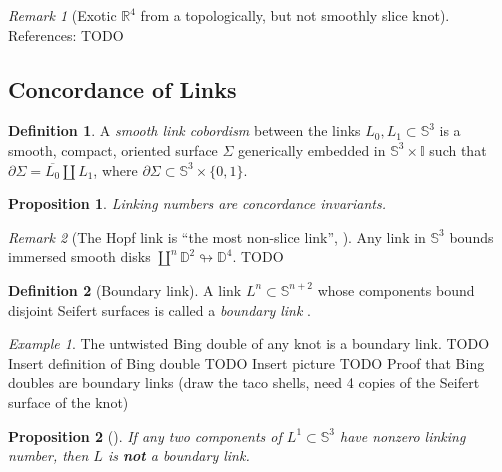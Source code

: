 \documentclass[nobib]{tufte-book} %
\newtheorem{proposition}{Proposition}
\theoremstyle{definition}
\newtheorem{definition}{Definition}
\theoremstyle{remark}
\newtheorem{remark}{Remark}
\newtheorem{example}{Example}
\newcommand{\sphere}[1]{\mathbb{S}^{#1}}
\newcommand{\disk}[1]{\mathbb{D}^{#1}}
\newcommand{\interval}{\mathbb{I}}
\newcommand{\R}{\mathbb{R}}
\begin{document}
\begin{remark}[Exotic $\R^{4}$ from a topologically, but
	not smoothly slice knot]
	References:
	\citep{57926}
	TODO
\end{remark}

\subsection{Concordance of Links}

\begin{definition}
	A \textit{smooth link cobordism}  between the links
	$L_0, L_1 \subset \sphere{3}$
	is a smooth, compact, oriented surface
	$\Sigma$ generically embedded in $\sphere{3} \times \interval$ such that
	$\partial \Sigma = \overline{L_{0}} \coprod L_{1}$,
	where $\partial \Sigma \subset \sphere{3} \times \{0, 1\}$.
\end{definition}

\begin{proposition}
	Linking numbers are concordance invariants.
\end{proposition}

\begin{remark}[The Hopf link is ``the most non-slice link'', \citep{krushkal2015slicing}]
	Any link in $\sphere{3}$ bounds immersed smooth disks
	$\coprod^{n} \disk{2} \looparrowright \disk{4}$.
	TODO
\end{remark}


\begin{definition}[Boundary link]
	A link $L^{n} \subset \sphere{n+2}$ whose components bound disjoint Seifert surfaces
	is called a \textit{boundary link} .
\end{definition}

\begin{example}
	The untwisted Bing double of any knot is a boundary link.
	TODO Insert definition of Bing double
	TODO Insert picture
	TODO Proof that Bing doubles are boundary links
	(draw the taco shells, need 4 copies of the Seifert surface
	of the knot)
\end{example}

\begin{proposition}[{\citep[5.E.1]{rolfsen2003knots}}]
	If any two components of $L^{1} \subset \sphere{3}$
	have nonzero linking number, then $L$ is \textbf{not}
	a boundary link.
\end{proposition}
\end{document}
